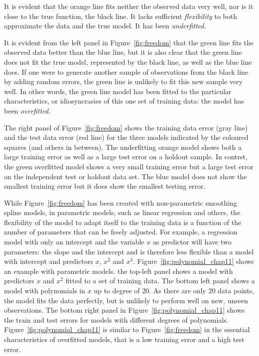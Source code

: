 It is evident that the orange line fits neither the observed data very well, nor is it close to the true function, the black line. It lacks sufficient \emph{flexibility} to both approximate the data and the true model. It has been \emph{underfitted}.

It is evident from the left panel in Figure~\ref{fig:freedom} that the green line fits the observed data better than the blue line, but it is also clear that the green line does not fit the true model, represented by the black line, as well as the blue line does. If one were to generate another sample of observations from the black line by adding random errors, the green line is unlikely to fit this new sample very well. In other words, the green line model has been fitted to the particular characteristics, or idiosyncrasies of this one set of training data: the model has been \emph{overfitted}.

The right panel of Figure~\ref{fig:freedom} shows the training data error (gray line) and the test data error (red line) for the three models indicated by the coloured squares (and others in between). The underfitting orange model shows both a large training error as well as a large test error on a holdout sample. In contrst, the green overfitted model shows a very small training error but a large test error on the independent test or holdout data set. The blue model does not show the smallest training error but it does show the smallest testing error.

While Figure~\ref{fig:freedom} has been created with non-parametric smoothing spline models, in parametric models, such as linear regression and others, the flexibility of the model to adapt itself to the training data is a function of the number of parameters that can be freely adjusted. For example, a regression model with only an intercept and the variable $x$ as predictor will have two parameters: the slope and the intercept and is therefore less flexible than a model with intercept and predictors $x$, $x^2$ and $x^3$. Figure~\ref{fig:polynomial_chap11} shows an example with parametric models. the top-left panel shows a model with predictors $x$ and $x^2$ fitted to a set of training data. The bottom left panel shows a model with polynomials in $x$ up to degree of 20. As there are only 20 data points, the model fits the data perfectly, but is unlikely to perform well on new, unseen observations. The bottom right panel in Figure~\ref{fig:polynomial_chap11} shows the train and test errors for models with different degrees of polynomials. Figure~\ref{fig:polynomial_chap11} is similar to Figure~\ref{fig:freedom} in the essential characteristics of overfitted models, that is a low training error and a high test error.

